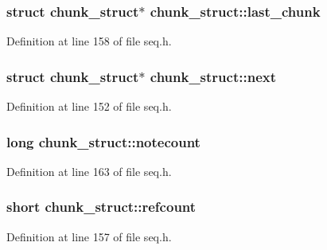 \subsubsection[{\texorpdfstring{last\+\_\+chunk}{last_chunk}}]{\setlength{\rightskip}{0pt plus 5cm}struct {\bf chunk\+\_\+struct}$\ast$ chunk\+\_\+struct\+::last\+\_\+chunk}\hypertarget{structchunk__struct_a962fec9809069227f1725c0b3e45243e}{}\label{structchunk__struct_a962fec9809069227f1725c0b3e45243e}


Definition at line 158 of file seq.\+h.

\subsubsection[{\texorpdfstring{next}{next}}]{\setlength{\rightskip}{0pt plus 5cm}struct {\bf chunk\+\_\+struct}$\ast$ chunk\+\_\+struct\+::next}\hypertarget{structchunk__struct_a7cb05782775004328fdfa5f6846bfed9}{}\label{structchunk__struct_a7cb05782775004328fdfa5f6846bfed9}


Definition at line 152 of file seq.\+h.

\subsubsection[{\texorpdfstring{notecount}{notecount}}]{\setlength{\rightskip}{0pt plus 5cm}long chunk\+\_\+struct\+::notecount}\hypertarget{structchunk__struct_ae61e516279de8801dc94b743370b0b61}{}\label{structchunk__struct_ae61e516279de8801dc94b743370b0b61}


Definition at line 163 of file seq.\+h.

\subsubsection[{\texorpdfstring{refcount}{refcount}}]{\setlength{\rightskip}{0pt plus 5cm}short chunk\+\_\+struct\+::refcount}\hypertarget{structchunk__struct_a4163a53b7a225fb5f9e3f9563cc650d3}{}\label{structchunk__struct_a4163a53b7a225fb5f9e3f9563cc650d3}


Definition at line 157 of file seq.\+h.

